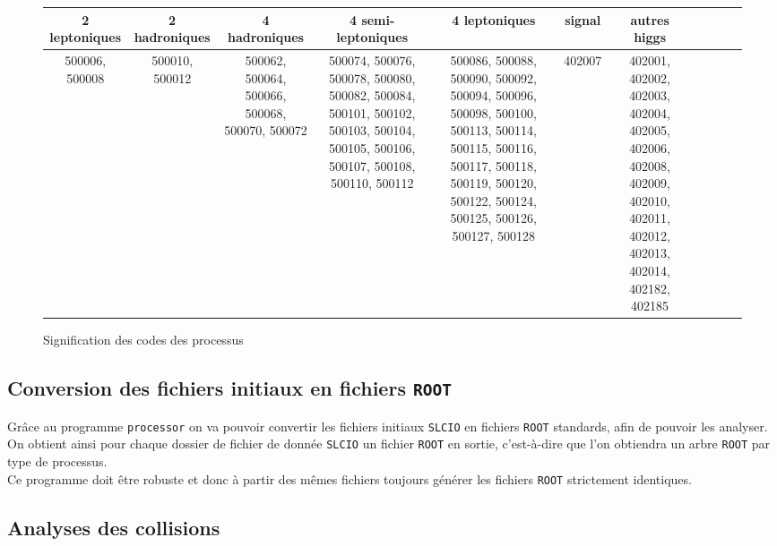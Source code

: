 \documentclass[10pt,a4paper]{report}
\newcommand{\cad}{c'est-à-dire\xspace}
\newcommand{\ROOT}{\texttt{ROOT}\xspace}
\newcommand{\SLCIO}{\texttt{SLCIO}\xspace}
\newcommand{\processor}{\texttt{processor}\xspace}
\begin{document}
\begin{figure}[h!]
    \centering
    \begin{tabular}{ | c | c | c | c | c | c | c | c | c | c | c | }
        \hline
        2 leptoniques & 2 hadroniques & 4 hadroniques & 4 semi-leptoniques & 4 leptoniques & signal & autres higgs \\
        \hline
        500006, 500008 & 500010, 500012 & 500062, 500064, 500066, 500068, 500070, 500072 & 500074, 500076, 500078, 500080, 500082, 500084, 500101, 500102, 500103, 500104, 500105, 500106, 500107, 500108, 500110, 500112 & 500086, 500088, 500090, 500092, 500094, 500096, 500098, 500100,
        500113, 500114, 500115, 500116, 500117, 500118, 500119, 500120,
        500122, 500124, 500125, 500126, 500127, 500128 & 402007 & 402001, 402002, 402003, 402004, 402005, 402006, 402008, 402009, 402010, 402011, 402012, 402013, 402014, 402182, 402185 \\
        \hline
    \end{tabular}
    \caption{Signification des codes des processus}
    \label{data:def}
\end{figure}

    
    

\subsection{Conversion des fichiers initiaux en fichiers \ROOT}

Grâce au programme \processor on va pouvoir convertir les fichiers initiaux \SLCIO en fichiers \ROOT standards, afin de pouvoir les analyser.\\

On obtient ainsi pour chaque dossier de fichier de donnée \SLCIO un fichier \ROOT en sortie, \cad que l'on obtiendra un arbre \ROOT par type de processus.\\

Ce programme doit être robuste et donc à partir des mêmes fichiers toujours générer les fichiers \ROOT strictement identiques.

\subsection{Analyses des collisions}
\end{document}
